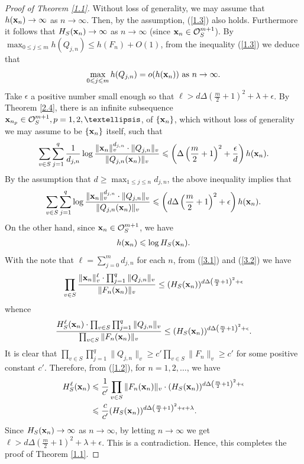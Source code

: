 \documentclass[10pt,a4paper]{amsart}
\begin{document}
\begin{proof}[Proof of Theorem \ref{1.1}]
Without loss of generality, we may assume that $h({\bf x}_{n})\rightarrow \infty$ as $n\rightarrow \infty$. Then, by the assumption, (\ref{1.3}) also holds. Furthermore it follows that $H_{S}({\bf x}_{n})\rightarrow \infty$ as $n\rightarrow \infty$ (since ${\bf x}_n\in\mathcal{O}_{S}^{m+1}$). By $\max _{0\leqslant j\leqslant m}h(Q_{j, n}) \leqslant h(F_{n})+O(1)$, from the inequality (\ref{1.3}) we deduce that 
$$\max _{0\leqslant j\leqslant m}h(Q_{j, n})=o(h({\bf x}_{n})) \text { as } n\rightarrow \infty.$$
Take $\epsilon$ a positive number small enough so that $\ell>d\Delta\left(\frac{m}{2}+1\right)^{2}+\lambda+\epsilon$.
By Theorem \ref{2.4}, there is an infinite subsequence ${\bf x}_{n_p}\in \mathcal{O}_{S}^{m+1},p=1,2, \ldots$, of $\{{\bf x}_{n}\}$, which without loss of generality we may assume to be $\{{\bf x}_{n}\}$ itself, such that
$$\sum_{v \in S} \sum_{j=1}^{q}\dfrac{1}{d_{j,n}} \log \frac{\|{\bf x}_{n}\|_{v}^{d_{j,n}} \cdot\|Q_{j, n}\|_{v}}{\|Q_{j, n}({\bf x}_{n})\|_{v}} \leqslant \left(\Delta\left(\frac{m}{2}+1\right)^{2}+\frac{\epsilon}{d}\right) h({\bf x}_{n}).$$
By the assumption that $d\geqslant \max_{1\leqslant j\leqslant n}d_{j,n}$, the above inequality implies that
\begin{align}\label{3.1}
\sum_{v \in S} \sum_{j=1}^{q}\log \frac{\|{\bf x}_{n}\|_{v}^{d_{j,n}}\cdot\|Q_{j, n}\|_{v}}{\|Q_{j, n}({\bf x}_{n})\|_{v}} \leqslant \left(d\Delta\left(\frac{m}{2}+1\right)^{2}+\epsilon\right) h({\bf x}_{n}).
\end{align}
On the other hand, since ${\bf x}_{n} \in \mathcal{O}_{S}^{m+1}$, we have
\begin{align}\label{3.2}
h({\bf x}_{n}) \leqslant \log H_{S}({\bf x}_{n}).
\end{align}
With the note that $\ell=\sum_{j=0}^md_{j,n}$ for each $n$, from (\ref{3.1}) and (\ref{3.2}) we have 
$$\prod_{v \in S} \frac{\|{\bf x}_{n}\|_{v}^{\ell} \cdot \prod_{j=1}^{q}\|Q_{j, n}\|_{v}}{\|F_{n}({\bf x}_{n})\|_{v}} \leq(H_{S}({\bf x}_{n}))^{d\Delta\left(\frac{m}{2}+1\right)^{2}+\epsilon}$$
whence
$$\frac{H_{S}^{\ell}({\bf x}_{n}) \cdot \prod_{v \in S} \prod_{j=1}^{q}\|Q_{j, n}\|_{v}}{\prod_{v \in S}\|F_{n}({\bf x}_{n})\|_{v}} \leq(H_{S}({\bf x}_{n}))^{d\Delta\left(\frac{m}{2}+1\right)^{2}+\epsilon}.$$
It is clear that $\prod_{v \in S} \prod_{j=1}^{q}\|Q_{j, n}\|_{v} \geq c' \prod_{v \in S}\|F_{n}\|_{v} \geq c'$ for some positive constant $c'$.
Therefore, from (\ref{1.2}), for $n=1,2, \ldots$, we have
\begin{align*}
H_{S}^{\ell}({\bf x}_{n})&\leqslant \frac{1}{c'} \prod_{v \in S}\|F_{n}({\bf x}_{n})\|_{v} \cdot(H_{S}({\bf x}_{n}))^{d\Delta\left(\frac{m}{2}+1\right)^{2}+\epsilon}\\ 
&\leqslant \frac{c}{c'}(H_{S}({\bf x}_{n}))^{d\Delta\left(\frac{m}{2}+1\right)^{2}+\epsilon+\lambda}. 
\end{align*}
Since $H_{S}({\bf x}_{n})\rightarrow \infty$ as $n\rightarrow \infty$, by letting $n\rightarrow \infty$ we get $\ell>d\Delta(\frac{m}{2}+1)^{2}+\lambda+\epsilon$. This is a contradiction. Hence, this completes the proof of Theorem \ref{1.1}.
\end{proof}
\end{document}
